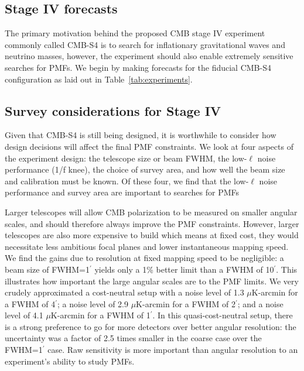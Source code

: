 \documentclass[apj]{emulateapj}
\newcommand{\ukarcmin}{\ensuremath{\mu}K-arcmin}
\begin{document}
\subsection{Stage IV forecasts}

The primary motivation behind the proposed CMB stage IV experiment commonly called CMB-S4 is to search for inflationary gravitational waves and neutrino masses, however, the experiment should also enable extremely sensitive searches for PMFs. 
We begin by making forecasts for the fiducial CMB-S4 configuration as laid out in Table~\ref{tab:experiments}. 



\subsection{Survey considerations for Stage IV}

Given that CMB-S4 is still being designed, it is worthwhile to consider how design decisions will affect the final PMF constraints. 
We look at four aspects of the experiment design: the telescope size or beam FWHM, the low-$\ell$ noise performance (1/f knee),  the choice of survey area, and how well the beam size and calibration must be known. 
Of these four, we find that the low-$\ell$ noise performance and survey area are important to searches for PMFs 

Larger telescopes will allow CMB polarization to be measured on smaller angular scales, and should therefore always improve the PMF constraints. 
However, larger telescopes are also more expensive to build which means at fixed cost, they would necessitate less ambitious focal planes and lower instantaneous mapping speed. 
We find the gains due to resolution at fixed mapping speed to be negligible: a beam size of FWHM=1$^\prime$ yields only a 1\% better limit than a FWHM of 10$^\prime$. 
This illustrates how important the large angular scales are to the PMF limits. 
We very crudely approximated a cost-neutral setup with a noise level of 1.3 \ukarcmin{} for a FWHM of 4$^\prime$; a noise level of 2.9 \ukarcmin{} for a FWHM of 2$^\prime$; and a noise level of 4.1 \ukarcmin{} for a FWHM of 1$^\prime$. 
In this quasi-cost-neutral setup, there is a strong preference to go for more detectors over better angular resolution: the uncertainty was a factor of 2.5 times smaller in the coarse case over the FWHM=1$^\prime$ case. 
Raw sensitivity is more important than angular resolution to an experiment's ability to study PMFs.
\end{document}
